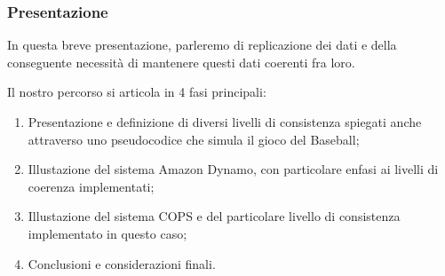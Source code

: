 \begin{frame}
\frametitle{Presentazione}
In questa breve presentazione, parleremo di replicazione dei dati
e della conseguente necessità di mantenere questi dati coerenti fra loro.

Il nostro percorso si articola in 4 fasi principali:
\begin{enumerate}
	\item Presentazione e definizione di diversi livelli di consistenza
		  spiegati anche attraverso uno pseudocodice che simula il gioco del Baseball;
	\item Illustazione del sistema Amazon Dynamo, con particolare enfasi ai
		  livelli di coerenza implementati;
	\item Illustazione del sistema COPS e del particolare livello di consistenza
		  implementato in questo caso;
	\item Conclusioni e considerazioni finali.
\end{enumerate}
\end{frame}